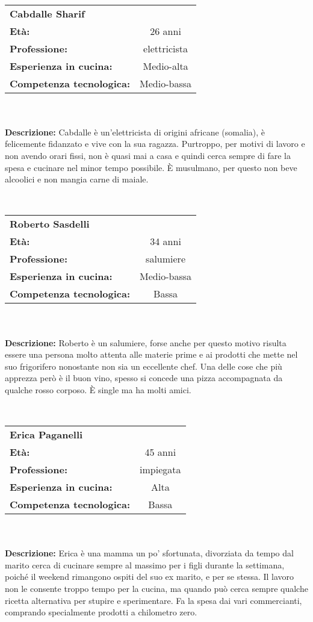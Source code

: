 \hrulefill\\
\begin{tabular}{l | c}
	\textbf{Cabdalle Sharif} & \\
	\textbf{Età:} & 26 anni\\
	\textbf{Professione:} & elettricista\\
	\textbf{Esperienza in cucina:} & Medio-alta\\
	\textbf{Competenza tecnologica:} & Medio-bassa\\
\end{tabular}\\\\
	\textbf{Descrizione:}
	Cabdalle è un'elettricista di origini africane (somalia), è felicemente
	fidanzato e vive con la sua ragazza. Purtroppo, per motivi di lavoro e
	non avendo orari fissi, non è quasi mai a casa e quindi cerca sempre di
	fare la spesa e cucinare nel minor tempo possibile.  È musulmano, per
	questo non beve alcoolici e non mangia carne di maiale.

\hrulefill\\
\begin{tabular}{l | c}
	\textbf{Roberto Sasdelli} & \\
	\textbf{Età:} & 34 anni\\
	\textbf{Professione:} & salumiere\\
	\textbf{Esperienza in cucina:} & Medio-bassa\\
	\textbf{Competenza tecnologica:} & Bassa\\
\end{tabular}\\\\
	\textbf{Descrizione:}
	Roberto è un salumiere, forse anche per questo motivo risulta essere una
	persona molto attenta alle materie prime e ai prodotti che mette nel suo
	frigorifero nonostante non sia un eccellente chef.  Una delle cose che
	più apprezza però è il buon vino, spesso si concede una pizza
	accompagnata da qualche rosso corposo. È single ma ha molti amici.

\hrulefill\\
\begin{tabular}{l | c}
	\textbf{Erica Paganelli} & \\
	\textbf{Età:} & 45 anni\\
	\textbf{Professione:} & impiegata\\
	\textbf{Esperienza in cucina:} & Alta\\
	\textbf{Competenza tecnologica:} & Bassa\\
\end{tabular}\\\\
	\textbf{Descrizione:}
	Erica è una mamma un po' sfortunata, divorziata da tempo dal marito
	cerca di cucinare sempre al massimo per i figli durante la settimana,
	poiché il weekend rimangono ospiti del suo ex marito, e per se stessa.
	Il lavoro non le consente troppo tempo per la cucina, ma quando può
	cerca sempre qualche ricetta alternativa per stupire e sperimentare. Fa
	la spesa dai vari commercianti, comprando specialmente prodotti a
	chilometro zero.


